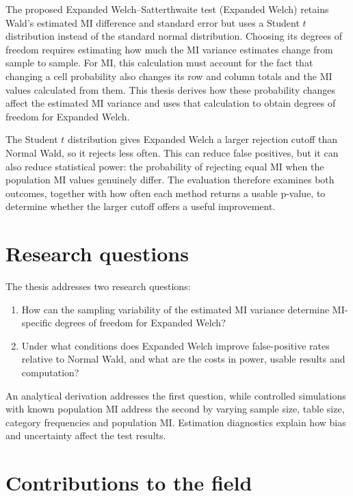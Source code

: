 The proposed Expanded Welch--Satterthwaite test (Expanded Welch) retains
Wald's estimated MI difference and standard error but uses a Student
\(t\) distribution instead of the standard normal distribution. Choosing
its degrees of freedom requires estimating how much the MI variance
estimates change from sample to sample. For MI, this calculation must
account for the fact that changing a cell probability also changes its
row and column totals and the MI values calculated from them. This thesis
derives how these probability changes affect the estimated MI variance
and uses that calculation to obtain degrees of freedom for Expanded Welch.

The Student \(t\) distribution gives Expanded Welch a larger rejection
cutoff than Normal Wald, so it rejects less often. This can reduce false
positives, but it can also reduce statistical power: the probability of
rejecting equal MI when the population MI values genuinely differ.
The evaluation therefore examines both outcomes, together
with how often each method returns a usable p-value, to determine whether
the larger cutoff offers a useful improvement.

\section{Research questions}

The thesis addresses two research questions:
\begin{enumerate}
  \item How can the sampling variability of the estimated MI variance
  determine MI-specific degrees of freedom for Expanded Welch?
  \item Under what conditions does Expanded Welch improve false-positive
  rates relative to Normal Wald, and what are the costs in power,
  usable results and computation?
\end{enumerate}

An analytical derivation addresses the first question, while controlled
simulations with known population MI address the second by varying
sample size, table size, category frequencies and population MI.
Estimation diagnostics explain how bias and uncertainty affect the test
results.

\section{Contributions to the field}

